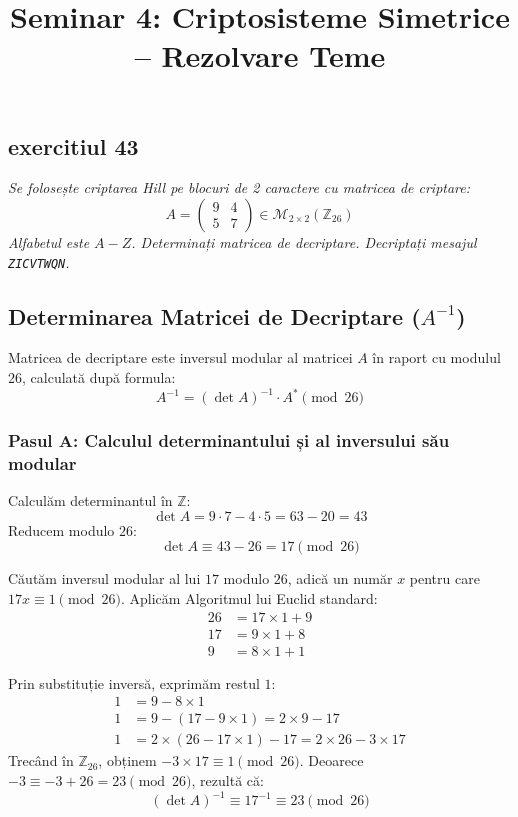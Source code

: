 \documentclass[12pt]{article}
\title{Seminar 4: Criptosisteme Simetrice -- Rezolvare Teme}
\author{}
\date{} %
\begin{document}
\maketitle


\subsection*{exercitiul 43}
\textit{Se folosește criptarea Hill pe blocuri de 2 caractere cu matricea de criptare:
\[
A = \begin{pmatrix} 9 & 4 \\ 5 & 7 \end{pmatrix} \in \mathcal{M}_{2\times2}(\mathbb{Z}_{26})
\]
Alfabetul este $A-Z$. Determinați matricea de decriptare. Decriptați mesajul \texttt{ZICVTWQN}.}


\subsection*{Determinarea Matricei de Decriptare ($A^{-1}$)}
Matricea de decriptare este inversul modular al matricei $A$ în raport cu modulul $26$, calculată după formula:
\[
A^{-1} = (\det A)^{-1} \cdot A^* \pmod{{26}}
\]

\subsubsection*{Pasul A: Calculul determinantului și al inversului său modular}
Calculăm determinantul în $\mathbb{Z}$:
\[
\det A = 9 \cdot 7 - 4 \cdot 5 = 63 - 20 = 43
\]
Reducem modulo $26$:
\[
\det A \equiv 43 - 26 = 17 \pmod{{26}}
\]

Căutăm inversul modular al lui $17$ modulo $26$, adică un număr $x$ pentru care $17x \equiv 1 \pmod{{26}}$. 
Aplicăm Algoritmul lui Euclid standard:
\begin{align*}
26 &= 17 \times 1 + 9 \\
17 &= 9 \times 1 + 8 \\
9 &= 8 \times 1 + 1
\end{align*}

Prin substituție inversă, exprimăm restul $1$:
\begin{align*}
1 &= 9 - 8 \times 1 \\
1 &= 9 - (17 - 9 \times 1) = 2 \times 9 - 17 \\
1 &= 2 \times (26 - 17 \times 1) - 17 = 2 \times 26 - 3 \times 17
\end{align*}
Trecând în $\mathbb{Z}_{26}$, obținem $-3 \times 17 \equiv 1 \pmod{{26}}$. 
Deoarece $-3 \equiv -3 + 26 = 23 \pmod{{26}}$, rezultă că:
\[
(\det A)^{-1} \equiv 17^{-1} \equiv 23 \pmod{{26}}
\]
\end{document}
